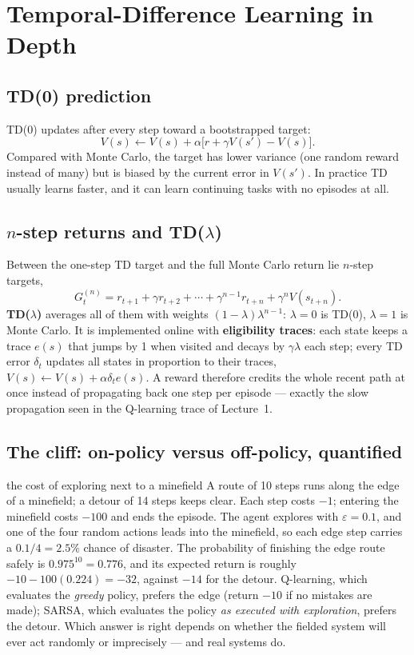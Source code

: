 \documentclass[11pt]{article}
\begin{document}
\section{Temporal-Difference Learning in Depth}
\subsection{TD(0) prediction}
TD(0) updates after every step toward a bootstrapped target:
\[V(s)\leftarrow V(s)+\alpha\big[r+\gamma V(s')-V(s)\big].\]
Compared with Monte Carlo, the target has lower variance (one random reward instead of many) but is biased by the current error in $V(s')$. In practice TD usually learns faster, and it can learn continuing tasks with no episodes at all.
\subsection{$n$-step returns and TD($\lambda$)}
Between the one-step TD target and the full Monte Carlo return lie $n$-step targets,
\[G_t^{(n)}=r_{t+1}+\gamma r_{t+2}+\cdots+\gamma^{n-1}r_{t+n}+\gamma^nV(s_{t+n}).\]
\textbf{TD($\lambda$)} averages all of them with weights $(1-\lambda)\lambda^{n-1}$: $\lambda=0$ is TD(0), $\lambda=1$ is Monte Carlo. It is implemented online with \textbf{eligibility traces}: each state keeps a trace $e(s)$ that jumps by 1 when visited and decays by $\gamma\lambda$ each step; every TD error $\delta_t$ updates all states in proportion to their traces, $V(s)\leftarrow V(s)+\alpha\delta_te(s)$. A reward therefore credits the whole recent path at once instead of propagating back one step per episode --- exactly the slow propagation seen in the Q-learning trace of Lecture~1.
\subsection{The cliff: on-policy versus off-policy, quantified}
\begin{example}{the cost of exploring next to a minefield}
A route of 10 steps runs along the edge of a minefield; a detour of 14 steps keeps clear. Each step costs $-1$; entering the minefield costs $-100$ and ends the episode. The agent explores with $\varepsilon=0.1$, and one of the four random actions leads into the minefield, so each edge step carries a $0.1/4=2.5\%$ chance of disaster. The probability of finishing the edge route safely is $0.975^{10}=0.776$, and its expected return is roughly $-10-100(0.224)=-32$, against $-14$ for the detour. Q-learning, which evaluates the \emph{greedy} policy, prefers the edge (return $-10$ if no mistakes are made); SARSA, which evaluates the policy \emph{as executed with exploration}, prefers the detour. Which answer is right depends on whether the fielded system will ever act randomly or imprecisely --- and real systems do.
\end{example}
\end{document}
